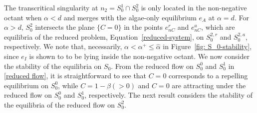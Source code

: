 \documentclass{article}
\theoremstyle{definition}
\numberwithin{equation}{section}
\begin{document}
The transcritical singularity \cite{MKrupa_2001} at $n_2=S_0^1\cap S_0^2$ is only located in the non-negative octant when $\alpha<d$ and merges with the algae-only equilibrium $e_A$ at $\alpha=d$. For $\alpha>d$, $S_0^2$ intersects the plane $\{C=0\}$ in the points $e_{nC}^{r}$ and $e_{nC}^a$, which are equilibria of the reduced problem, Equation~\eqref{reduced-system}, on $S_{0}^{2,r}$ and $S_{0}^{2,a}$, respectively. We note that, necessarily, $\alpha<\alpha^+\leq \hat{\alpha}$ in Figure~\ref{fig: S_0-stability}, since $e_I$ is shown to to be lying inside the non-negative octant. We now consider the stability of the equilibria on $S_0$. From the reduced flow on $S_0^0$ and $S_0^1$ in \eqref{reduced flow}, it is straightforward to see that $C=0$ corresponds to a repelling equilibrium on $S_0^0$, while $C=1-\beta(>0)$ and $C=0$ are attracting under the reduced flow on $S_0^0$ and $S_0^1$, respectively. The next result considers the stability of the equilibria of the reduced flow on $S_0^2$.
\end{document}
